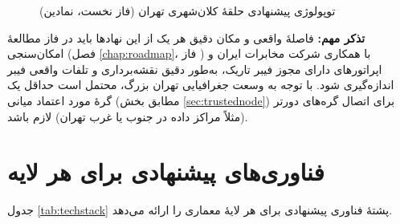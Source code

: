\begin{figure}[htbp]
\centering
{}
\caption{توپولوژی پیشنهادی حلقهٔ  کلان‌شهری تهران (فاز نخست، نمادین)}
\label{fig:tehran}
\end{figure}

\textbf{تذکر مهم:} فاصلهٔ واقعی و مکان دقیق هر یک از این نهادها باید در فاز مطالعهٔ امکان‌سنجی (فصل \ref{chap:roadmap}، فاز ) با همکاری شرکت مخابرات ایران و اپراتورهای دارای مجوز فیبر تاریک، به‌طور دقیق نقشه‌برداری و تلفات واقعی فیبر اندازه‌گیری شود. با توجه به وسعت جغرافیایی تهران بزرگ، محتمل است حداقل یک گرهٔ مورد اعتماد میانی (مطابق بخش \ref{sec:trustednode}) برای اتصال گره‌های دورتر (مثلاً مراکز داده در جنوب یا غرب تهران) لازم باشد.

\section{فناوری‌های پیشنهادی برای هر لایه}
\label{sec:tehrantech}

جدول \ref{tab:techstack} پشتهٔ فناوری پیشنهادی برای هر لایهٔ معماری را ارائه می‌دهد.

